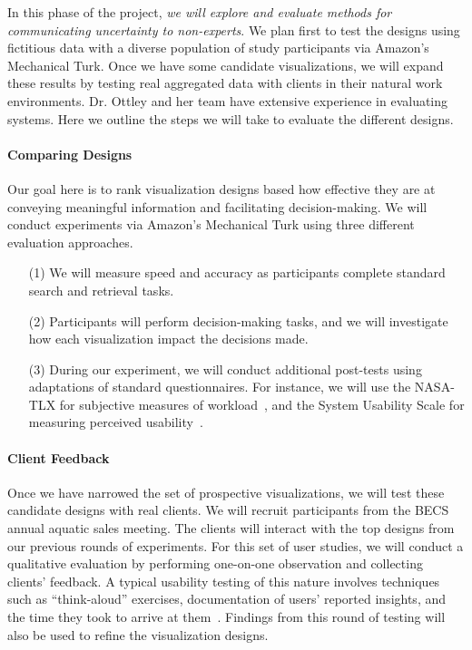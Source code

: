 In this phase of the project, \emph{we will explore and evaluate methods for communicating uncertainty to non-experts}.
We plan first to test the designs using fictitious data with a diverse population of study participants via Amazon's Mechanical Turk. 
Once we have some candidate visualizations, we will expand these results by testing real aggregated data with clients in their natural work environments.
Dr. Ottley and her team have extensive experience in evaluating systems.
Here we outline the steps we will take to evaluate the different designs.   

\paragraph{Comparing Designs} 
Our goal here is to rank visualization designs based how effective they are at conveying meaningful information and facilitating decision-making.  
We will conduct experiments via Amazon's Mechanical Turk using three different evaluation approaches.
\begin{itemize}
\item[(1)] We will measure speed and accuracy as participants complete standard search and retrieval tasks.
\item[(2)] Participants will perform decision-making tasks, and we will investigate how each visualization impact the decisions made.
\item[(3)] During our experiment, we will conduct additional post-tests using adaptations of standard questionnaires. For instance, we will use the NASA-TLX for subjective measures of workload~\cite{hart1988development}, and the System Usability Scale for measuring perceived usability~\cite{bangor2008empirical}. 
\end{itemize}

\paragraph{Client Feedback}
Once we have narrowed the set of prospective visualizations, we will test these candidate designs with real clients. 
We will recruit participants from the BECS annual aquatic sales meeting.   
The clients will interact with the top designs from our previous rounds of experiments. 
For this set of user studies, we will conduct a qualitative evaluation by performing one-on-one observation and collecting clients' feedback.
A typical usability testing of this nature involves techniques such as “think-aloud” exercises, documentation of users’ reported insights, and the time they took to arrive at them~\cite{charlton2001handbook,hix1993developing,lewis1982using}. Findings from this round of testing will also be used to refine the visualization designs.

